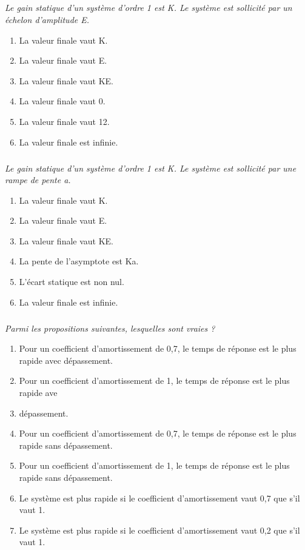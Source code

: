 \documentclass[10pt,fleqn]{article} %
\begin{document}
\begin{multicols}{2}
\subparagraph{}\textit{Le gain statique d'un système d'ordre 1 est K. Le système est sollicité par un échelon d'amplitude E.}
\begin{enumerate}
\item La valeur finale vaut K.
\item La valeur finale vaut E.
\item La valeur finale vaut KE.
\item La valeur finale vaut 0.
\item La valeur finale vaut 12.
\item La valeur finale est infinie.
\end{enumerate}


\subparagraph{}\textit{ Le gain statique d'un système d'ordre 1 est K. Le système est sollicité par une rampe de pente a.}
\begin{enumerate}
\item La valeur finale vaut K.
\item La valeur finale vaut E.
\item La valeur finale vaut KE.
\item La pente de l'asymptote est Ka.
\item L'écart statique est non nul.
\item La valeur finale est infinie.
\end{enumerate}


\subparagraph{}\textit{Parmi les propositions suivantes, lesquelles sont vraies ?}
\begin{enumerate}
\item Pour un coefficient d'amortissement de 0,7, le temps de réponse est le plus rapide avec
dépassement.
\item Pour un coefficient d'amortissement de 1, le temps de réponse est le plus rapide ave\item dépassement.
\item Pour un coefficient d'amortissement de 0,7, le temps de réponse est le plus rapide sans
dépassement.
\item Pour un coefficient d'amortissement de 1, le temps de réponse est le plus rapide sans dépassement.
\item Le système est plus rapide si le coefficient d'amortissement vaut 0,7 que s'il vaut 1.
\item Le système est plus rapide si le coefficient d'amortissement vaut 0,2 que s'il vaut 1.
\end{enumerate}


\end{multicols}
\end{document}
